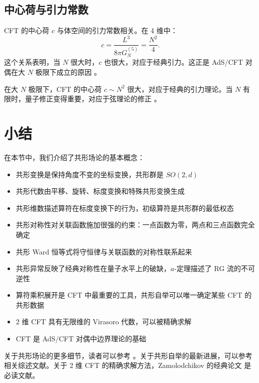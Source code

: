 \subsection{中心荷与引力常数}

\begin{theorem}[中心荷与引力常数的关系]
CFT 的中心荷 $c$ 与体空间的引力常数相关。在 4 维中：
\begin{equation}
    c = \frac{L^3}{8\pi G_N^{(5)}} = \frac{N^2}{4}.
\end{equation}
这个关系表明，当 $N$ 很大时，$c$ 也很大，对应于经典引力。这正是 AdS/CFT 对偶在大 $N$ 极限下成立的原因 \cite{Maldacena1997}。
\end{theorem}

\begin{remark}[大 $N$ 极限]
在大 $N$ 极限下，CFT 的中心荷 $c \sim N^2$ 很大，对应于经典的引力理论。当 $N$ 有限时，量子修正变得重要，对应于弦理论的修正 \cite{Aharony1999}。
\end{remark}

\section{小结}

在本节中，我们介绍了共形场论的基本概念：
\begin{itemize}
    \item 共形变换是保持角度不变的坐标变换，共形群是 $SO(2,d)$
    \item 共形代数由平移、旋转、标度变换和特殊共形变换生成
    \item 共形维数描述算符在标度变换下的行为，初级算符是共形群的最低权态
    \item 共形对称性对关联函数施加很强的约束：一点函数为零，两点和三点函数完全确定
    \item 共形 Ward 恒等式将守恒律与关联函数的对称性联系起来
    \item 共形异常反映了经典对称性在量子水平上的破缺，$a$-定理描述了 RG 流的不可逆性 \cite{Komargodski2011}
    \item 算符乘积展开是 CFT 中最重要的工具，共形自举可以唯一确定某些 CFT 的共形数据
    \item 2 维 CFT 具有无限维的 Virasoro 代数，可以被精确求解 \cite{Zamolodchikov1986}
    \item CFT 是 AdS/CFT 对偶中边界理论的基础 \cite{Maldacena1997}
\end{itemize}

\begin{note}[进一步阅读]
关于共形场论的更多细节，读者可以参考 \cite{Natsuume2014, Ammon2015, Aharony1999}。关于共形自举的最新进展，可以参考相关综述文献。关于 2 维 CFT 的精确求解方法，Zamolodchikov 的经典论文 \cite{Zamolodchikov1986} 是必读文献。
\end{note}

